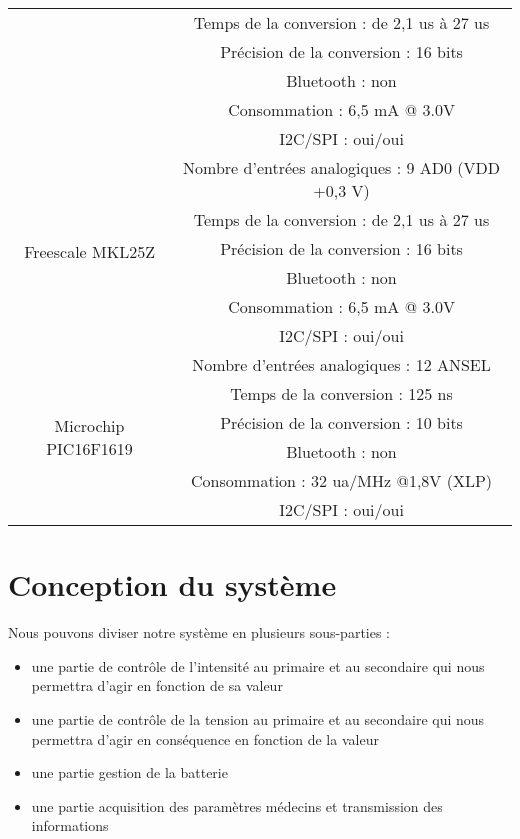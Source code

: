 \documentclass{report}
\begin{document}
\begin{tabular}{|c|c|}
& Temps de la conversion : de 2,1 us \`{a} 27 us\\ 
& Pr\'{e}cision de la conversion : 16 bits \\ 
& Bluetooth : non \\ 
& Consommation : 6,5 mA @ 3.0V \\ 
& I2C/SPI : oui/oui \\ \hline
\multirow{6}{*}{Freescale MKL25Z} 
& Nombre d’entr\'{e}es analogiques : 9 AD0 (VDD +0,3 V)  \\ 
& Temps de la conversion : de 2,1 us \`{a} 27 us\\ 
& Pr\'{e}cision de la conversion : 16 bits \\ 
& Bluetooth : non \\ 
& Consommation : 6,5 mA @ 3.0V \\ 
& I2C/SPI : oui/oui \\ \hline
\multirow{6}{*}{Microchip PIC16F1619} 
& Nombre d’entr\'{e}es analogiques : 12 ANSEL  \\ 
& Temps de la conversion : 125 ns\\ 
& Pr\'{e}cision de la conversion : 10 bits \\ 
& Bluetooth : non \\ 
& Consommation : 32 ua/MHz @1,8V (XLP) \\ 
& I2C/SPI : oui/oui \\ \hline
\end{tabular}
 
\chapter{Conception du syst\`{e}me}

Nous pouvons diviser notre syst\`{e}me en plusieurs sous-parties :
\begin{itemize}
\item une partie de contrôle de l’intensit\'{e} au primaire et au secondaire qui nous permettra d’agir en fonction de sa valeur
\item une partie de contrôle de la tension au primaire et au secondaire qui nous permettra d’agir en cons\'{e}quence en fonction de la valeur
\item une partie gestion de la batterie
\item une partie acquisition des param\`{e}tres m\'{e}decins et transmission des informations
\end{itemize}

\begin{center}
\end{center}
\end{document}

